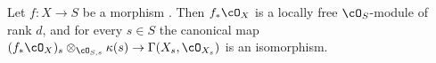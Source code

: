\begin{lemma}
\label{lem:pc-flf-properties}
Let $f:X\to S$ be a morphism
.  Then $f_*\cO_X$ is a locally free $\cO_S$-module of rank $d$,
and for every $s\in S$ the canonical map
$(f_*\cO_X)_s\otimes_{\cO_{S,s}}\kappa(s)\to
\Gamma(X_s,\cO_{X_s})$ is an isomorphism.
\end{lemma}
